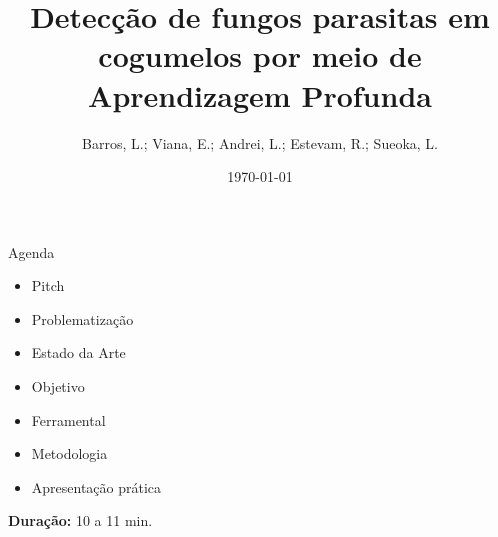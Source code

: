 \documentclass[aspectratio=169]{beamer}
\title{Detecção de fungos parasitas em cogumelos por meio de Aprendizagem Profunda}
\subtitle{}
\author[DSM]{Barros, L.; Viana, E.; Andrei, L.; Estevam, R.; Sueoka, L.}
\institute{Desenvolvimento de Software Multiplataforma\\FATEC Registro}
\date{\today}
\begin{document}
\begin{frame}
  \vspace{0.8cm}
  \begin{center}
    
    \vspace{0.4cm}
    
    {\normalsize\bfseries\inserttitle}\par
    
    \vspace{0.2cm}
    
    {\tiny\insertauthor}\par
    
    \vspace{0.1cm}
    
    {\small\textcolor{azulComplementar}{\insertsubtitle}}\par
    
    \vspace{0.5cm}
    
    
    \vspace{0.3cm}
    
    {\scriptsize\insertinstitute}\par
    
    \vspace{0.01cm}
    
    {\tiny\textcolor{azulComplementar}{\insertdate}}\par
  \end{center}
\end{frame}

\begin{frame}[b]{Agenda}
  \begin{itemize}
    \item Pitch
    \item Problematização
    \item Estado da Arte
    \item Objetivo
    \item Ferramental
    \item Metodologia
    \item Apresentação prática
  \end{itemize}
  
  \vfill
  
  \hfill{\scriptsize \textbf{Duração:} 10 a 11 min.}
\end{frame}
\end{document}
